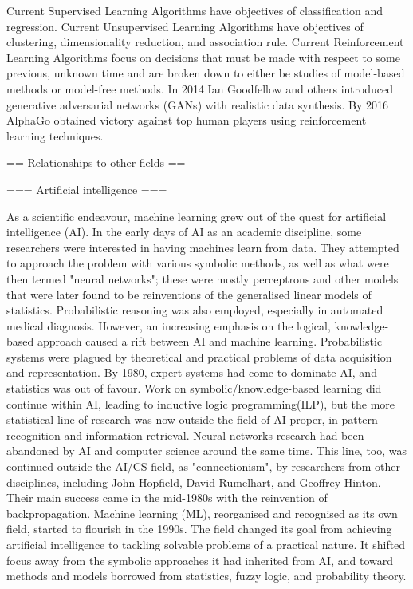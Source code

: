 Current Supervised Learning Algorithms have objectives of classification and regression.
Current Unsupervised Learning Algorithms have objectives of clustering, dimensionality reduction, and association rule.
Current Reinforcement Learning Algorithms focus on decisions that must be made with respect to some previous, unknown time and are broken down to either be studies of model-based methods or model-free methods.
In 2014 Ian Goodfellow and others introduced generative adversarial networks (GANs) with realistic data synthesis. By 2016 AlphaGo obtained victory against top human players using reinforcement learning techniques.


== Relationships to other fields ==


=== Artificial intelligence ===

As a scientific endeavour, machine learning grew out of the quest for artificial intelligence (AI). In the early days of AI as an academic discipline, some researchers were interested in having machines learn from data. They attempted to approach the problem with various symbolic methods, as well as what were then termed "neural networks"; these were mostly perceptrons and other models that were later found to be reinventions of the generalised linear models of statistics. Probabilistic reasoning was also employed, especially in automated medical diagnosis.
However, an increasing emphasis on the logical, knowledge-based approach caused a rift between AI and machine learning. Probabilistic systems were plagued by theoretical and practical problems of data acquisition and representation. By 1980, expert systems had come to dominate AI, and statistics was out of favour. Work on symbolic/knowledge-based learning did continue within AI, leading to inductive logic programming(ILP), but the more statistical line of research was now outside the field of AI proper, in pattern recognition and information retrieval. Neural networks research had been abandoned by AI and computer science around the same time. This line, too, was continued outside the AI/CS field, as "connectionism", by researchers from other disciplines, including John Hopfield, David Rumelhart, and Geoffrey Hinton. Their main success came in the mid-1980s with the reinvention of backpropagation.
Machine learning (ML), reorganised and recognised as its own field, started to flourish in the 1990s. The field changed its goal from achieving artificial intelligence to tackling solvable problems of a practical nature. It shifted focus away from the symbolic approaches it had inherited from AI, and toward methods and models borrowed from statistics, fuzzy logic, and probability theory.


